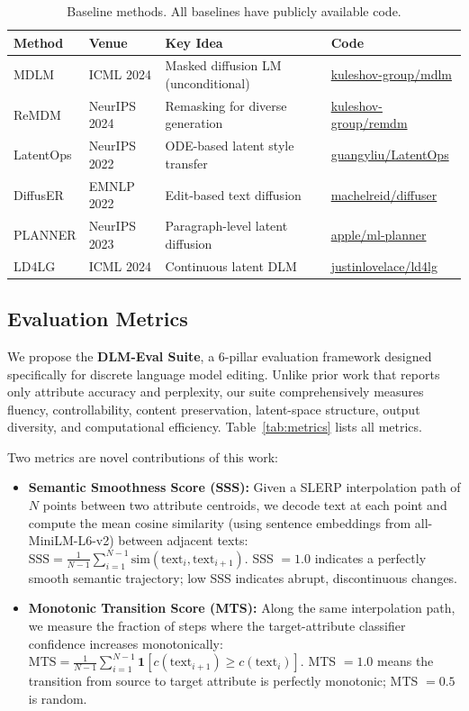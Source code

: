 \documentclass{article}
\begin{document}
\begin{table}[h]
\centering
\caption{Baseline methods. All baselines have publicly available code.}
\label{tab:baselines}
\begin{tabular}{llll}
\toprule
\textbf{Method} & \textbf{Venue} & \textbf{Key Idea} & \textbf{Code} \\
\midrule
MDLM & ICML 2024 & Masked diffusion LM (unconditional) & \href{https://github.com/kuleshov-group/mdlm}{kuleshov-group/mdlm} \\
ReMDM & NeurIPS 2024 & Remasking for diverse generation & \href{https://github.com/kuleshov-group/remdm}{kuleshov-group/remdm} \\
LatentOps & NeurIPS 2022 & ODE-based latent style transfer & \href{https://github.com/guangyliu/LatentOps}{guangyliu/LatentOps} \\
DiffusER & EMNLP 2022 & Edit-based text diffusion & \href{https://github.com/machelreid/diffuser}{machelreid/diffuser} \\
PLANNER & NeurIPS 2023 & Paragraph-level latent diffusion & \href{https://github.com/apple/ml-planner}{apple/ml-planner} \\
LD4LG & ICML 2024 & Continuous latent DLM & \href{https://github.com/justinlovelace/latent-diffusion-for-language}{justinlovelace/ld4lg} \\
\bottomrule
\end{tabular}
\end{table}

\subsection{Evaluation Metrics}

We propose the \textbf{DLM-Eval Suite}, a 6-pillar evaluation framework designed specifically for discrete language model editing. Unlike prior work that reports only attribute accuracy and perplexity, our suite comprehensively measures fluency, controllability, content preservation, latent-space structure, output diversity, and computational efficiency. Table~\ref{tab:metrics} lists all metrics.

Two metrics are novel contributions of this work:
\begin{itemize}
  \item \textbf{Semantic Smoothness Score (SSS):} Given a SLERP interpolation path of $N$ points between two attribute centroids, we decode text at each point and compute the mean cosine similarity (using sentence embeddings from all-MiniLM-L6-v2) between adjacent texts: $\text{SSS} = \frac{1}{N-1} \sum_{i=1}^{N-1} \text{sim}(\text{text}_i, \text{text}_{i+1})$. SSS $= 1.0$ indicates a perfectly smooth semantic trajectory; low SSS indicates abrupt, discontinuous changes.
  \item \textbf{Monotonic Transition Score (MTS):} Along the same interpolation path, we measure the fraction of steps where the target-attribute classifier confidence increases monotonically: $\text{MTS} = \frac{1}{N-1} \sum_{i=1}^{N-1} \mathbf{1}[c(\text{text}_{i+1}) \ge c(\text{text}_i)]$. MTS $= 1.0$ means the transition from source to target attribute is perfectly monotonic; MTS $= 0.5$ is random.
\end{itemize}
\end{document}
